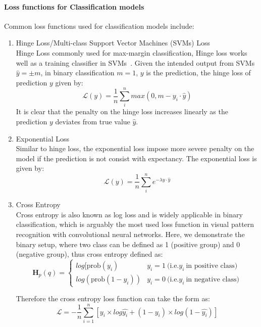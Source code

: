 \paragraph {Loss functions for Classification models}
Common loss functions used for classification models include:

\begin{enumerate}
    \item Hinge Loss/Multi-class Support Vector Machines (SVMs) Loss \\
Hinge Loss commonly used for max-margin classification, Hinge loss works well as a training classifier in SVMs~\cite{Cortes_1995}. Given the intended output from SVMs $\hat{y} = \pm m$, in binary classification $m = 1$, $y$ is the prediction, the hinge loss of prediction $y$ given by:
\begin {equation}
    \mathcal{L}(y) = \frac {1}{n} \sum_i^n max(0,m - y_i \cdot \hat{y})
\end{equation}
It is clear that the penalty on the hinge loss increases linearly as the prediction $y$ deviates from true value $\hat{y}$.
    \item Exponential Loss \\
Similar to hinge loss, the exponential loss impose more severe penalty on the model if the prediction is not consist with expectancy. The exponential loss is given by:
\begin {equation}
    \mathcal{L}(y) = \frac {1}{n} \sum_i^n e^{-\lambda y \cdot \hat{y}}
\end{equation}
    \item Cross Entropy \\
Cross entropy is also known as log loss and is widely applicable in binary classification, which is arguably the most used loss function in visual pattern recognition with convolutional neural networks. Here, we demonstrate the binary setup, where two class can be defined as 1 (positive group) and 0 (negative group), thus cross entropy defined as:
\begin{equation}
   \mathbf{H}_p(q) = \left\{ 
    \begin{array}{ll}
        log[\mathrm{prob}(y_i) & y_i = 1~\text{(i.e.} y_i~\text{in positive class)}  \\
        log(\mathrm{prob}(1-y_i)) & y_i = 0~\text{(i.e.} y_i~\text{in negative class)}  
    \end{array}\right.
\end{equation}

Therefore the cross entropy loss function can take the form as:
\begin{equation}
    \mathcal{L} = -\frac{1}{n}\sum_{i=1}^n [y_i \times log\hat{y_i} +(1-y_i) \times log(1-\hat{y_i}) ] 
\end{equation}


\end{enumerate}
